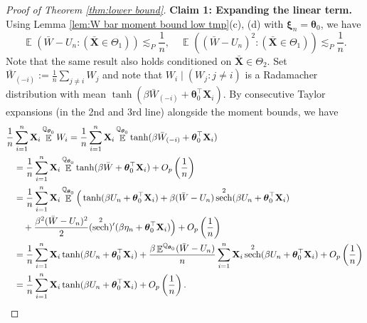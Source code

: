 \documentclass[preprint,reqno]{imsart}
\newcommand{\ttheta}{\boldsymbol{\theta}}
\DeclareMathOperator{\QQCW}{\QQ_{\ttheta}^{\text{CW}}}
\DeclareMathOperator{\sech}{sech}
\DeclareMathOperator{\EE}{\mathbb{E}}
\DeclareMathOperator{\QQ}{\mathbb{Q}}
\newcommand{\X}{\mathbf{X}}
\newcommand{\xxi}{\boldsymbol \xi}
\DeclareMathOperator{\sumin}{\sum_{\mathnormal i=1}^{\mathnormal n}}
\begin{document}
\begin{appendix}
\begin{proof}[Proof of Theorem \ref{thm:lower bound}]
\textbf{Claim 1: Expanding the linear term.}
%
%
    Using Lemma \ref{lem:W bar moment bound low tmp}(c), (d) with $\xxi_n = \ttheta_0$, we have
    $$\EE^{\QQCW} \left( \bar{W}-U_n : (\bar{\X} \in \Theta_1) \right) \lesssim_P \frac{1}{n},\quad \EE^{\QQCW} \left( (\bar{W}-U_n)^2 : (\bar{\X} \in \Theta_1) \right) \lesssim_P \frac{1}{n}.$$
    Note that the same result also holds conditioned on $\bar{\X} \in \Theta_2$. Set $\bar{W}_{(-i)} := \frac{1}{n} \sum_{j \neq i} W_j$ and note that $W_i \mid (W_j : j \neq i)$ is a Radamacher distribution with mean $\tanh(\beta \bar{W}_{(-i)} + \ttheta_0^\top \X_i)$.
    By consecutive Taylor expansions (in the 2nd and 3rd line) alongside the moment bounds, we have 
    \begin{align*}
    \frac{1}{n} &\sumin \X_i \EE^{\QQ_{\ttheta_0}} W_i = \frac{1}{n} \sumin \X_i \EE^{\QQ_{\ttheta_0}} \tanh(\beta \bar{W}_{(-i)} + \ttheta_0^\top \X_i)  \\
    &= \frac{1}{n} \sumin \X_i \EE^{\QQ_{\ttheta_0}}  \tanh(\beta \bar{W} + \ttheta_0^\top \X_i) + O_p \left( \frac{1}{n} \right) \\
    &= \frac{1}{n} \sumin \X_i \EE^{\QQ_{\ttheta_0}} \Big(\tanh(\beta U_n + \ttheta_0^\top \X_i) + \beta (\bar{W} - U_n) \sech^2(\beta U_n + \ttheta_0^\top \X_i) \\
    &\quad + \frac{\beta^2 (\bar{W} - U_n)^2}{2} (\sech^2)'(\beta \eta_n + \ttheta_0^\top \X_i) \Big) + O_p \left( \frac{1}{n} \right) \\
    &= \frac{1}{n} \sumin \X_i \tanh(\beta U_n + \ttheta_0^\top \X_i) + \frac{\beta \EE^{\QQ_{\ttheta_0}} (\bar{W} - U_n )}{n} \sumin \X_i \sech^2(\beta U_n + \ttheta_0^\top \X_i) + O_p \left( \frac{1}{n} \right) \\
    &= \frac{1}{n} \sumin \X_i \tanh(\beta U_n + \ttheta_0^\top \X_i) + O_p \left( \frac{1}{n} \right).
\end{align*}
%
%
%



\end{proof}
\end{appendix}
\end{document}
